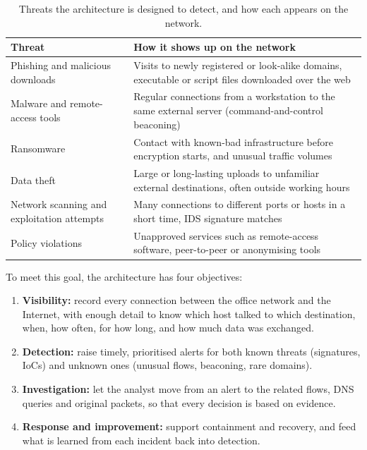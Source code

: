 \begin{table}[htbp]
  \centering
  \caption{Threats the architecture is designed to detect, and how each appears on the network.}
  \label{tab:threats}
  \footnotesize
  \begin{tabularx}{\linewidth}{@{}lY@{}}
    \toprule
    \textbf{Threat} & \textbf{How it shows up on the network} \\
    \midrule
    Phishing and malicious downloads & Visits to newly registered or look-alike domains, executable or script files downloaded over the web \\
    Malware and remote-access tools & Regular connections from a workstation to the same external server (command-and-control beaconing) \\
    Ransomware & Contact with known-bad infrastructure before encryption starts, and unusual traffic volumes \\
    Data theft & Large or long-lasting uploads to unfamiliar external destinations, often outside working hours \\
    Network scanning and exploitation attempts & Many connections to different ports or hosts in a short time, IDS signature matches \\
    Policy violations & Unapproved services such as remote-access software, peer-to-peer or anonymising tools \\
    \bottomrule
  \end{tabularx}
\end{table}

To meet this goal, the architecture has four objectives:
\begin{enumerate}
  \item \textbf{Visibility:} record every connection between the office network and the Internet, with enough detail to know which host talked to which destination, when, how often, for how long, and how much data was exchanged.
  \item \textbf{Detection:} raise timely, prioritised alerts for both known threats (signatures, IoCs) and unknown ones (unusual flows, beaconing, rare domains).
  \item \textbf{Investigation:} let the analyst move from an alert to the related flows, DNS queries and original packets, so that every decision is based on evidence.
  \item \textbf{Response and improvement:} support containment and recovery, and feed what is learned from each incident back into detection.
\end{enumerate}

